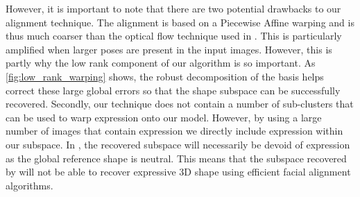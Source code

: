 However, it is important to note that there are two potential drawbacks to our
alignment technique. The alignment is based on a Piecewise Affine warping and is
thus much coarser than the optical flow technique used in \citet{RefWorks:311}.
This is particularly amplified when larger poses are present in the input
images. However, this is partly why the low rank component of our algorithm is
so important. As \cref{fig:low_rank_warping} shows, the robust
decomposition of the basis helps correct these large global errors so that the
shape subspace can be successfully recovered. Secondly, our technique does not
contain a number of sub-clusters that can be used to warp expression onto our
model. However, by using a large number of images that contain expression we
directly include expression within our subspace. In \citet{RefWorks:311}, the
recovered subspace will necessarily be devoid of expression as the global
reference shape is neutral. This means that the subspace recovered by
\citet{RefWorks:311} will not be able to recover expressive 3D shape using
efficient facial alignment algorithms.
